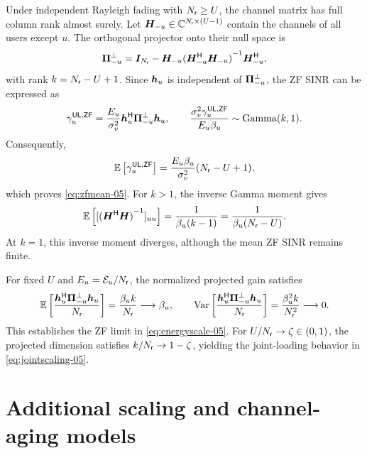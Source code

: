 Under independent Rayleigh fading with $N_{\mathsf{r}}\geq U$, the channel matrix has full column rank almost surely. Let $\bm{H}_{-u}\in\mathbb{C}^{N_{\mathsf{r}}\times(U-1)}$ contain the channels of all users except $u$. The orthogonal projector onto their null space is
\begin{equation*}
	\bm{\Pi}_{-u}^{\perp}
	=\bm{I}_{N_{\mathsf{r}}}
	-\bm{H}_{-u}{({\bm{H}}^{\mathsf{H}}_{-u}\bm{H}_{-u})}^{-1}{\bm{H}}^{\mathsf{H}}_{-u},
\end{equation*}
with rank $k=N_{\mathsf{r}}-U+1$. Since $\bm{h}_u$ is independent of $\bm{\Pi}_{-u}^{\perp}$, the ZF SINR can be expressed as
\begin{equation}
	\gamma_u^{\mathsf{UL},\mathsf{ZF}}
	=\frac{E_u}{\sigma_v^2}
	{\bm{h}}^{\mathsf{H}}_u\bm{\Pi}_{-u}^{\perp}\bm{h}_u,
	\qquad
	\frac{\sigma_v^2\gamma_u^{\mathsf{UL},\mathsf{ZF}}}{E_u\beta_u}
	\sim\operatorname{Gamma}(k,1).
\end{equation}
Consequently,
\begin{equation*}
	\mathbb{E}\left[\gamma_u^{\mathsf{UL},\mathsf{ZF}}\right]
	=\frac{E_u\beta_u}{\sigma_v^2}(N_{\mathsf{r}}-U+1),
\end{equation*}
which proves \eqref{eq:zfmean-05}. For $k>1$, the inverse Gamma moment gives
\begin{equation*}
	\mathbb{E}\left[[{({\bm{H}}^{\mathsf{H}}\bm{H})}^{-1}]_{uu}\right]
	=\frac{1}{\beta_u(k-1)}
	=\frac{1}{\beta_u(N_{\mathsf{r}}-U)}.
\end{equation*}
At $k=1$, this inverse moment diverges, although the mean ZF SINR remains finite.

For fixed $U$ and $E_u=\mathcal E_u/N_{\mathsf{r}}$, the normalized projected gain satisfies
\begin{equation*}
	\mathbb{E}\left[\frac{{\bm{h}}^{\mathsf{H}}_u\bm{\Pi}_{-u}^{\perp}\bm{h}_u}{N_{\mathsf{r}}}\right]
	=\frac{\beta_u k}{N_{\mathsf{r}}}\longrightarrow\beta_u,
	\qquad
	\operatorname{Var}\left[\frac{{\bm{h}}^{\mathsf{H}}_u\bm{\Pi}_{-u}^{\perp}\bm{h}_u}{N_{\mathsf{r}}}\right]
	=\frac{\beta_u^2 k}{N_{\mathsf{r}}^2}\longrightarrow0.
\end{equation*}
This establishes the ZF limit in \eqref{eq:energyscale-05}. For $U/N_{\mathsf{r}}\to\zeta\in(0,1)$, the projected dimension satisfies $k/N_{\mathsf{r}}\to1-\zeta$, yielding the joint-loading behavior in \eqref{eq:jointscaling-05}.


\section{Additional scaling and channel-aging models}
\label{app:extensions-05}

